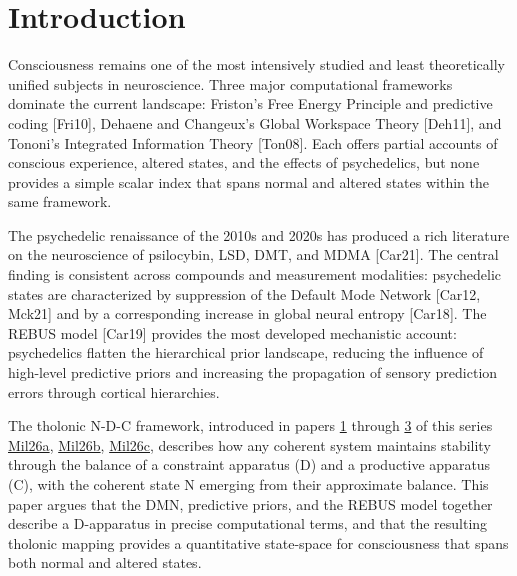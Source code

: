 \documentclass[12pt]{article}
\begin{document}
\section{Introduction}\label{introduction}

Consciousness remains one of the most intensively studied and least
theoretically unified subjects in neuroscience. Three major
computational frameworks dominate the current landscape: Friston's Free
Energy Principle and predictive coding {[}Fri10{]}, Dehaene and
Changeux's Global Workspace Theory {[}Deh11{]}, and Tononi's Integrated
Information Theory {[}Ton08{]}. Each offers partial accounts of
conscious experience, altered states, and the effects of psychedelics,
but none provides a simple scalar index that spans normal and altered
states within the same framework.

The psychedelic renaissance of the 2010s and 2020s has produced a rich
literature on the neuroscience of psilocybin, LSD, DMT, and MDMA
{[}Car21{]}. The central finding is consistent across compounds and
measurement modalities: psychedelic states are characterized by
suppression of the Default Mode Network {[}Car12, Mck21{]} and by a
corresponding increase in global neural entropy {[}Car18{]}. The REBUS
model {[}Car19{]} provides the most developed mechanistic account:
psychedelics flatten the hierarchical prior landscape, reducing the
influence of high-level predictive priors and increasing the propagation
of sensory prediction errors through cortical hierarchies.

The tholonic N-D-C framework, introduced in papers
\href{https://github.com/baardev/truevalue/blob/main/docnav/Research/papers/1_recursive-tholonic-five-constants/1_recursive-tholonic-five-constants.pdf}{1}
through
\href{https://github.com/baardev/truevalue/blob/main/docnav/Research/papers/3_minimal-recursive-triadic-framework/3_minimal-recursive-triadic-framework.pdf}{3}
of this series
\href{https://github.com/baardev/truevalue/blob/main/docnav/Research/papers/1_recursive-tholonic-five-constants/1_recursive-tholonic-five-constants.pdf}{Mil26a},
\href{https://github.com/baardev/truevalue/blob/main/docnav/Research/papers/2_supply-chain-transparency-tvpci/2_supply-chain-transparency-tvpci.pdf}{Mil26b},
\href{https://github.com/baardev/truevalue/blob/main/docnav/Research/papers/3_minimal-recursive-triadic-framework/3_minimal-recursive-triadic-framework.pdf}{Mil26c},
describes how any coherent system maintains stability through the
balance of a constraint apparatus (D) and a productive apparatus (C),
with the coherent state N emerging from their approximate balance. This
paper argues that the DMN, predictive priors, and the REBUS model
together describe a D-apparatus in precise computational terms, and that
the resulting tholonic mapping provides a quantitative state-space for
consciousness that spans both normal and altered states.
\end{document}
